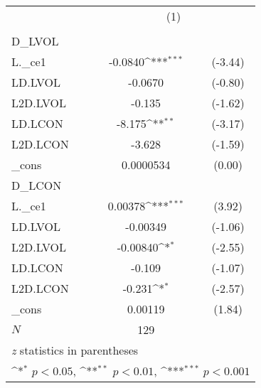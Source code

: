 {
\def\sym#1{\ifmmode^{#1}\else\(^{#1}\)\fi}
\begin{tabular}{l*{1}{cc}}
\hline\hline
          &\multicolumn{2}{c}{(1)}     \\
          &\multicolumn{2}{c}{}        \\
\hline
D\_LVOL    &                  &         \\
L.\_ce1    &  -0.0840\sym{***}&  (-3.44)\\
LD.LVOL   &  -0.0670         &  (-0.80)\\
L2D.LVOL  &   -0.135         &  (-1.62)\\
LD.LCON   &   -8.175\sym{**} &  (-3.17)\\
L2D.LCON  &   -3.628         &  (-1.59)\\
\_cons    &0.0000534         &   (0.00)\\
\hline
D\_LCON    &                  &         \\
L.\_ce1    &  0.00378\sym{***}&   (3.92)\\
LD.LVOL   & -0.00349         &  (-1.06)\\
L2D.LVOL  & -0.00840\sym{*}  &  (-2.55)\\
LD.LCON   &   -0.109         &  (-1.07)\\
L2D.LCON  &   -0.231\sym{*}  &  (-2.57)\\
\_cons    &  0.00119         &   (1.84)\\
\hline
\(N\)     &      129         &         \\
\hline\hline
\multicolumn{3}{l}{\footnotesize \textit{z} statistics in parentheses}\\
\multicolumn{3}{l}{\footnotesize \sym{*} \(p<0.05\), \sym{**} \(p<0.01\), \sym{***} \(p<0.001\)}\\
\end{tabular}
}
